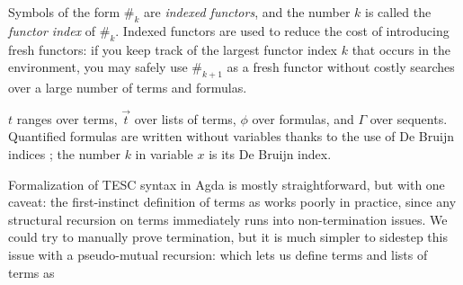 \documentclass[12pt]{article}
\newcommand{\idf}[1]{\#_{#1}}
\begin{document}
Symbols of the form $\idf{k}$ are \textit{indexed functors}, and the number $k$ is 
called the \textit{functor index} of $\idf{k}$. Indexed functors are used to reduce 
the cost of introducing fresh functors: if you keep track of the largest functor index
$k$ that occurs in the environment, you may safely use $\idf{k+1}$ as a fresh functor
without costly searches over a large number of terms and formulas.

$t$ ranges over terms, $\vec{t}$ over lists of terms, $\phi$ over formulas, and
$\Gamma$ over sequents.
Quantified formulas are written without variables thanks to the use of De Bruijn 
indices \cite{de1972lambda}; the number $k$ in variable $x$ is its De Bruijn index. 

Formalization of TESC syntax in Agda is mostly straightforward, but with one 
caveat: the first-instinct definition of terms as 
works poorly in practice, since any structural recursion on terms immediately 
runs into non-termination issues. We could try to manually prove termination,
but it is much simpler to sidestep this issue with a pseudo-mutual recursion:
which lets us define terms and lists of terms as



\end{document}
